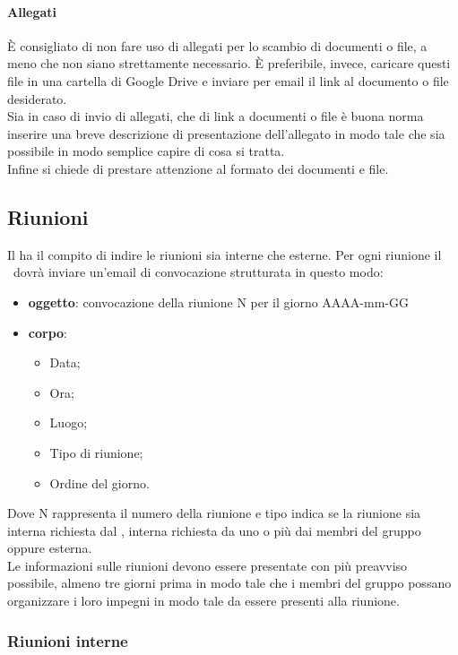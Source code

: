 \documentclass[../NormeProgetto.tex]{subfiles}
\begin{document}
		\paragraph{Allegati}
		È consigliato di non fare uso di allegati per lo scambio di documenti o file, a meno che non siano strettamente necessario. È preferibile, invece, caricare questi file in una cartella di Google Drive e inviare per email il link al documento o file desiderato. \\ Sia in caso di invio di allegati, che di link a documenti o file è buona norma inserire una breve descrizione di presentazione dell'allegato in modo tale che sia possibile in modo semplice capire di cosa si tratta. \\ Infine si chiede di prestare attenzione al formato dei documenti e file.
	\subsection{Riunioni}
		Il \responsabilediprogetto ha il compito di indire le riunioni sia interne che esterne. Per ogni riunione il \responsabilediprogetto\ dovrà inviare un'email di convocazione strutturata in questo modo:
		\begin{itemize}
		\item \textbf{oggetto}: convocazione della riunione N per il giorno AAAA-mm-GG
		\item \textbf{corpo}: 
		\begin{itemize}
		\item Data;
		\item Ora;
		\item Luogo;
		\item Tipo di riunione;
		\item Ordine del giorno.
		\end{itemize}
		\end{itemize}
		Dove N rappresenta il numero della riunione e tipo indica se la riunione sia interna richiesta dal \responsabilediprogetto, interna richiesta da uno o più dai membri del gruppo oppure esterna. \\
		Le informazioni sulle riunioni devono essere presentate con più preavviso possibile, almeno tre giorni prima in modo tale che i membri del gruppo possano organizzare i loro impegni in modo tale da essere presenti alla riunione.
		\subsubsection{Riunioni interne}
\end{document}
